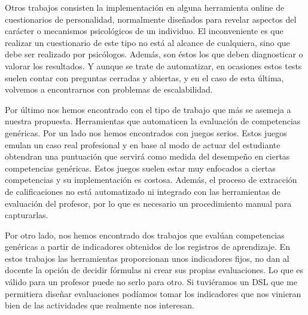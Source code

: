 Otros trabajos consisten la implementación en alguna herramienta online de cuestionarios de personalidad, normalmente diseñados para revelar aspectos del carácter o mecanismos psicológicos de un individuo. El inconveniente es que realizar un cuestionario de este tipo no está al alcance de cualquiera, sino que debe ser realizado por psicólogos. Además, son éstos los que deben diagnosticar o valorar los resultados. Y aunque se trate de automatizar, en ocasiones estos tests suelen contar con preguntas cerradas y abiertas, y en el caso de esta última, volvemos a encontrarnos con problemas de escalabilidad.

Por último nos hemos encontrado con el tipo de trabajo que más se asemeja a nuestra propuesta. Herramientas que automaticen la evaluación de competencias genéricas. Por un lado nos hemos encontrados con juegos serios. Estos juegos emulan un caso real profesional y en base al modo de actuar del estudiante obtendran una puntuación que servirá como medida del desempeño en ciertas competencias genéricas. Estos juegos suelen estar muy enfocados a ciertas competencias y su implementación es costosa. Además, el proceso de extracción de calificaciones no está automatizado ni integrado con las herramientas de evaluación del profesor, por lo que es necesario un procedimiento manual para capturarlas.

Por otro lado, nos hemos encontrado dos trabajos que evalúan competencias genéricas a partir de indicadores obtenidos de los registros de aprendizaje. En estos trabajos las herramientas proporcionan unos indicadores fijos, no dan al docente la opción de decidir fórmulas ni crear sus propias evaluaciones. Lo que es válido para un profesor puede no serlo para otro. Si tuviéramos un DSL que me permitiera diseñar evaluaciones podíamos tomar los indicadores que nos vinieran bien de las actividades que realmente nos interesan.

\pagestyle{fancy}



